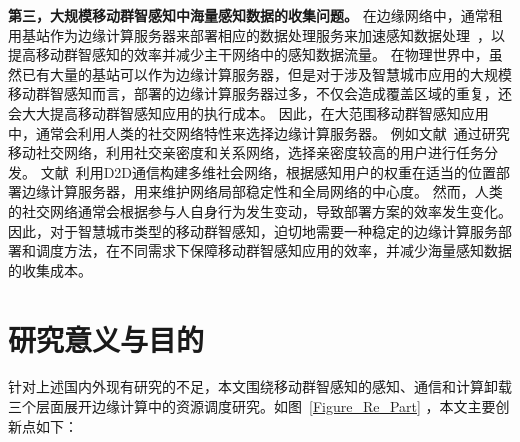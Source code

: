 

\textbf{第三，大规模移动群智感知中海量感知数据的收集问题。}
在边缘网络中，通常租用基站作为边缘计算服务器来部署相应的数据处理服务来加速感知数据处理~\cite{DBLP:journals/fgcs/TarnebergMWTEKE17,DBLP:journals/ton/ChenJLF16,DBLP:conf/IEEEcloud/HabakAHZ15}，以提高移动群智感知的效率并减少主干网络中的感知数据流量。
在物理世界中，虽然已有大量的基站可以作为边缘计算服务器，但是对于涉及智慧城市应用的大规模移动群智感知而言，部署的边缘计算服务器过多，不仅会造成覆盖区域的重复，还会大大提高移动群智感知应用的执行成本。
因此，在大范围移动群智感知应用中，通常会利用人类的社交网络特性来选择边缘计算服务器。
例如文献~通过研究移动社交网络，利用社交亲密度和关系网络，选择亲密度较高的用户进行任务分发。
文献~利用D2D通信构建多维社会网络，根据感知用户的权重在适当的位置部署边缘计算服务器，用来维护网络局部稳定性和全局网络的中心度。
然而，人类的社交网络通常会根据参与人自身行为发生变动，导致部署方案的效率发生变化。
因此，对于智慧城市类型的移动群智感知，迫切地需要一种稳定的边缘计算服务部署和调度方法，在不同需求下保障移动群智感知应用的效率，并减少海量感知数据的收集成本。


\section{研究意义与目的}

针对上述国内外现有研究的不足，本文围绕移动群智感知的感知、通信和计算卸载三个层面展开边缘计算中的资源调度研究。如图~\ref{Figure_Re_Part} ，本文主要创新点如下：

